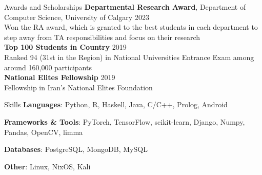 \documentclass{resume} %
\begin{document}


\begin{rSection}{Awards and Scholarships}
{\bf Departmental Research Award}{, Department of Computer Science, University of Calgary} \hfill{2023}
\\Won the RA award, which is granted to the best students in each department to step away from TA responsibilities and focus on their research\\
{\bf Top 100 Students in Country}{} \hfill{2019}
\\Ranked 94 (31st in the Region) in National Universities Entrance Exam among around 160,000 participants\\
{\bf National Elites Fellowship}{} \hfill{2019}
\\Fellowship in Iran's National Elites Foundation\\
\end{rSection}


\begin{rSection}{Skills}
\textbf{Languages}: Python, R, Haskell, Java, C/C++, Prolog, Android

\textbf{Frameworks \& Tools}: PyTorch, TensorFlow, scikit-learn, Django, Numpy, Pandas, OpenCV, limma

\textbf{Databases}: PostgreSQL, MongoDB, MySQL

\textbf{Other}: Linux, NixOS, Kali

\end{rSection}
\end{document}
